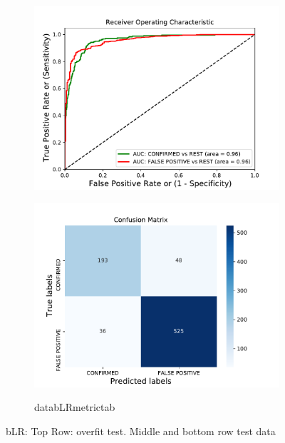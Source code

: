 \begin{figure}[H]
\begin{subfigure}{.49\textwidth}
                \includegraphics[width = 1\textwidth]{data/bLR_roc.pdf}
                \end{subfigure}
                \begin{subfigure}{.49\textwidth}
                \includegraphics[width = 1\textwidth]{data/bLR_cm.pdf}
                \end{subfigure}
                \begin{subfigure}{1\textwidth}
                \csname databLRmetrictab\endcsname
                \end{subfigure}
                \caption{bLR: Top Row: overfit test. Middle and bottom row test data}
                \label{fig:data/bLR_roc}
                \end{figure}